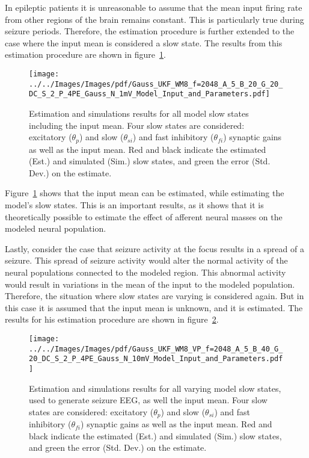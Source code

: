 In epileptic patients it is unreasonable to assume that the mean input firing rate from other regions of the brain remains constant. This is particularly true during seizure periods. Therefore, the estimation procedure is further extended to the case where the input mean is considered a slow state. The results from this estimation procedure are shown in figure~\ref{fig: ESTMP4}.

\begin{figure}
	\centering
		\texttt{[image: ../../Images/Images/pdf/Gauss\_UKF\_WM8\_f=2048\_A\_5\_B\_20\_G\_20\_DC\_S\_2\_P\_4PE\_Gauss\_N\_1mV\_Model\_Input\_and\_Parameters.pdf]}
	\caption{Estimation and simulations results for all model slow states including the input mean. Four slow states are considered: excitatory ($\theta_{p}$) and slow ($\theta_{si}$) and fast inhibitory ($\theta_{fi}$) synaptic gains as well as the input mean. Red and black indicate the estimated (Est.) and simulated (Sim.) slow states, and green the error (Std. Dev.) on the estimate.}
	\label{fig: ESTMP4}
\end{figure}


Figure~\ref{fig: ESTMP4} shows that the input mean can be estimated, while estimating the model's slow states. This is an important results, as it shows that it is theoretically possible to estimate the effect of afferent neural masses on the modeled neural population.

Lastly, consider the case that seizure activity at the focus results in a spread of a seizure. This spread of seizure activity would alter the normal activity of the neural populations connected to the modeled region. This abnormal activity would result in variations in the mean of the input to the modeled population. Therefore, the situation where slow states are varying is considered again. But in this case it is assumed that the input mean is unknown, and it is estimated. The results for his estimation procedure are shown in figure~\ref{fig: ESTMP4VP}.

\begin{figure}
	\centering
		\texttt{[image: ../../Images/Images/pdf/Gauss\_UKF\_WM8\_VP\_f=2048\_A\_5\_B\_40\_G\_20\_DC\_S\_2\_P\_4PE\_Gauss\_N\_10mV\_Model\_Input\_and\_Parameters.pdf]}
	\caption{Estimation and simulations results for all varying model slow states, used to generate seizure EEG, as well the input mean. Four slow states are considered: excitatory ($\theta_{p}$) and slow ($\theta_{si}$) and fast inhibitory ($\theta_{fi}$) synaptic gains as well as the input mean. Red and black indicate the estimated (Est.) and simulated (Sim.) slow states, and green the error (Std. Dev.) on the estimate.}
	\label{fig: ESTMP4VP}
\end{figure}


